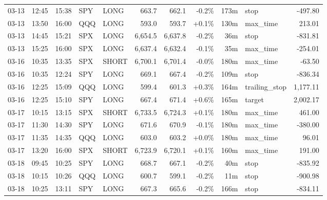 \documentclass[11pt,a4paper,twoside]{article}
\begin{document}
\begin{center}
\begin{longtable}{>{\color{txtmain}}l l l l l r r r r >{\color{txtmain}}l r}
03-13 & 12:45 & 15:38 & SPY & LONG & 663.7 & 662.1 & \textcolor{lossred}{-0.2\%} & 173m & stop & \textcolor{lossred}{-497.80} \\
03-13 & 13:50 & 16:00 & QQQ & LONG & 593.0 & 593.7 & \textcolor{wingreen}{+0.1\%} & 130m & max\_time & \textcolor{wingreen}{213.01} \\
03-13 & 14:45 & 15:21 & SPX & LONG & 6,654.5 & 6,637.8 & \textcolor{lossred}{-0.2\%} & 36m & stop & \textcolor{lossred}{-831.81} \\
03-13 & 15:25 & 16:00 & SPX & LONG & 6,637.4 & 6,632.4 & \textcolor{lossred}{-0.1\%} & 35m & max\_time & \textcolor{lossred}{-254.01} \\
03-16 & 10:35 & 13:35 & SPX & SHORT & 6,700.1 & 6,701.4 & \textcolor{lossred}{-0.0\%} & 180m & max\_time & \textcolor{lossred}{-63.50} \\
03-16 & 10:35 & 12:24 & SPY & LONG & 669.1 & 667.4 & \textcolor{lossred}{-0.2\%} & 109m & stop & \textcolor{lossred}{-836.34} \\
03-16 & 12:25 & 15:09 & QQQ & LONG & 599.4 & 601.3 & \textcolor{wingreen}{+0.3\%} & 164m & trailing\_stop & \textcolor{wingreen}{1,177.11} \\
03-16 & 12:25 & 15:10 & SPY & LONG & 667.4 & 671.4 & \textcolor{wingreen}{+0.6\%} & 165m & target & \textcolor{wingreen}{2,002.17} \\
03-17 & 10:15 & 13:15 & SPX & SHORT & 6,733.5 & 6,724.3 & \textcolor{wingreen}{+0.1\%} & 180m & max\_time & \textcolor{wingreen}{461.00} \\
03-17 & 11:30 & 14:30 & SPY & LONG & 671.6 & 670.9 & \textcolor{lossred}{-0.1\%} & 180m & max\_time & \textcolor{lossred}{-380.00} \\
03-17 & 11:35 & 14:35 & QQQ & LONG & 603.0 & 603.2 & \textcolor{wingreen}{+0.0\%} & 180m & max\_time & \textcolor{wingreen}{96.01} \\
03-17 & 13:20 & 16:00 & SPX & SHORT & 6,723.9 & 6,720.1 & \textcolor{wingreen}{+0.1\%} & 160m & max\_time & \textcolor{wingreen}{191.00} \\
03-18 & 09:45 & 10:25 & SPY & LONG & 668.7 & 667.1 & \textcolor{lossred}{-0.2\%} & 40m & stop & \textcolor{lossred}{-835.92} \\
03-18 & 10:15 & 10:26 & QQQ & LONG & 600.7 & 599.1 & \textcolor{lossred}{-0.2\%} & 11m & stop & \textcolor{lossred}{-900.98} \\
03-18 & 10:25 & 13:11 & SPY & LONG & 667.3 & 665.6 & \textcolor{lossred}{-0.2\%} & 166m & stop & \textcolor{lossred}{-834.11} \\

\end{longtable}
\end{center}
\end{document}
